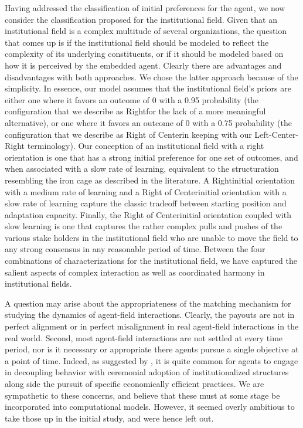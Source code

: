 \documentclass[12pt,letterpaper]{article}
\begin{document}
Having addressed the classification of initial preferences for the agent, we now consider the classification proposed for the institutional field. Given that an institutional field is a complex multitude of several organizations, the question that comes up is if the institutional field should be modeled to reflect the complexity of its underlying constituents, or if it should be modeled based on how it is perceived by the embedded agent. Clearly there are advantages and disadvantages with both approaches. We chose the latter approach because of the simplicity. 
In essence, our model assumes that the institutional field's priors are either one where it favors an outcome of 0 with a 0.95 probability (the configuration that we describe as \textquotesingle Right\textquotesingle  for the lack of a more meaningful alternative), or one where it favors an outcome of 0 with a 0.75 probability (the configuration that we describe as \textquotesingle Right of Center\textquotesingle  in keeping with our Left-Center-Right terminology). Our conception of an institutional field with a right orientation is one that has a strong initial preference for one set of outcomes, and when associated with a slow rate of learning, equivalent to the structuration resembling the iron cage as described in the literature. A \textquotesingle Right\textquotesingle  initial orientation with a medium rate of learning and a \textquotesingle Right of Center\textquotesingle  initial orientation with a slow rate of learning capture the classic tradeoff between starting position and adaptation capacity. Finally, the \textquotesingle Right of Center\textquotesingle  initial orientation coupled with slow learning is one that captures the rather complex pulls and pushes of the various stake holders in the institutional field who are unable to move the field to any strong consensus in any reasonable period of time. Between the four combinations of characterizations for the institutional field,  we have captured the salient aspects of complex interaction as well as coordinated harmony in institutional fields.

A question may arise about the appropriateness of the matching mechanism for studying the dynamics of agent-field interactions. Clearly, the payouts are not in perfect alignment or in perfect misalignment in real agent-field interactions in the real world. Second, most agent-field interactions are not settled at every time period, nor is it necessary or appropriate there agents pursue a single objective at a point of time. Indeed, as suggested by \cite{Kostova2008}, it is quite common for agents to engage in decoupling behavior with ceremonial adoption of institutionalized structures along side the pursuit of specific economically efficient practices. We are sympathetic to these concerns, and believe that these must at some stage be incorporated into computational models. However, it seemed overly ambitious to take those up in the initial study, and were hence left out.
\end{document}
